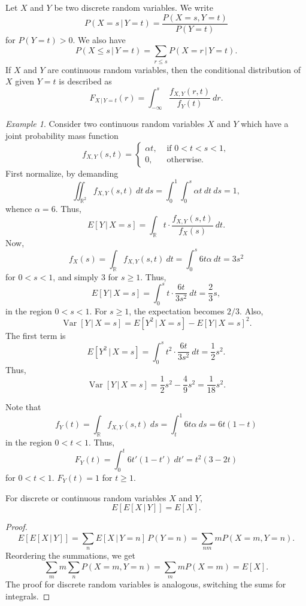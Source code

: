 \documentclass[11pt]{article}
\def\R{\mathbb{R}}
\newcommand\E[1]{E\left[#1\right]}
\newcommand\var[1]{\operatorname{Var}[#1]}
\theoremstyle{definition}
\theoremstyle{remark}
\newtheorem*{example}{Example}
\numberwithin{equation}{module}
\begin{document}
    \begin{definition}
        Let $X$ and $Y$ be two discrete random variables. We write \[
            P(X = s\,|\, Y = t) = \frac{P(X = s, Y = t)}{P(Y = t)}
        \] for $P(Y = t) > 0$. We also have \[
            P(X \leq s \,|\, Y = t) = \sum_{r \leq s}P(X = r\,|\, Y = t).
        \]
        If $X$ and $Y$ are continuous random variables, then the conditional
        distribution of $X$ given $Y = t$ is described as \[
            F_{X\,|\, Y = t}(r) = \int_{-\infty}^s \frac{f_{X, Y}(r, t)}{f_Y(t)}\:dr.
        \] 
    \end{definition}
    \begin{example}
        Consider two continuous random variables $X$ and $Y$ which have a joint
        probability mass function \[
            f_{X, Y}(s, t) = \begin{cases}
                \alpha t, &\text{ if }0 < t < s < 1, \\
                0, &\text{ otherwise.}
            \end{cases}
        \] First normalize, by demanding \[
            \iint_{\R^2} f_{X, Y}(s, t)\:dt\:ds = \int_0^1\int_0^s \alpha t\:dt\:ds = 1,
        \] whence $\alpha = 6$.
        Thus, \[
            \E{Y\,|\,X = s} = \int_\R t \cdot \frac{f_{X, Y}(s, t)}{f_X(s)}\:dt.
        \] Now, \[
            f_X(s) = \int_\R f_{X, Y}(s, t)\:dt = \int_0^s 6t\alpha\:dt = 3s^2
        \] for $0 < s < 1$, and simply $3$ for $s \geq 1$. Thus, \[
            \E{Y\,|\, X = s} = \int_0^s t\cdot \frac{6t}{3s^2}\:dt = \frac{2}{3}s,
        \] in the region $0 < s < 1$. For $s \geq 1$, the expectation becomes $2 /
        3$. 
        Also, \[
            \var{Y\,|\, X = s} = \E{Y^2 \,|\, X = s} - \E{Y \,|\,X = s}^2.
        \] The first term is \[
            \E{Y^2\,|\, X = s} = \int_0^s t^2\cdot \frac{6t}{3s^2}\:dt =
            \frac{1}{2}s^2.
        \] Thus, \[
            \var{Y\,|\, X = s} = \frac{1}{2}s^2 - \frac{4}{9}s^2 = \frac{1}{18}s^2.
        \]
        
        \noindent
        Note that \[
            f_Y(t) = \int_\R f_{X, Y}(s, t)\:ds = \int_t^1 6t\alpha\:ds = 6t(1 - t)
        \] in the region $0 < t < 1$. Thus, \[
            F_Y(t) = \int_0^t 6t'(1 - t')\:dt' = t^2(3 - 2t)
        \] for $0 < t < 1$. $F_Y(t) = 1$ for $t \geq 1$.
    \end{example}

    \begin{theorem}
        For discrete or continuous random variables $X$ and $Y$, \[
            \E{\E{X\,|\,Y}} = \E{X}.
        \] 
    \end{theorem}
    \begin{proof}
        \[
            \E{\E{X\,|\,Y}} = \sum_n \E{X\,|\,Y = n}\,P(Y = n) = \sum_{nm}
            m P(X = m, Y = n).
        \] Reordering the summations, we get \[
            \sum_{m}m\sum_{n}P(X = m, Y = n) = \sum_{m}mP(X = m) = \E{X}.
        \] The proof for discrete random variables is analogous, switching the sums
        for integrals.
    \end{proof}
    
\end{document}

